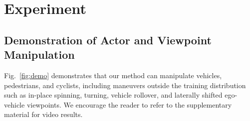 \documentclass[runningheads]{llncs}
\begin{document}
\section{Experiment}

\subsection{Demonstration of Actor and Viewpoint Manipulation}
Fig.~\ref{fig:demo} demonstrates that our method can manipulate vehicles, pedestrians, and cyclists, including maneuvers outside the training distribution such as in-place spinning, turning, vehicle rollover, and laterally shifted ego-vehicle viewpoints. We encourage the reader to refer to the supplementary material for video results.


\end{document}
